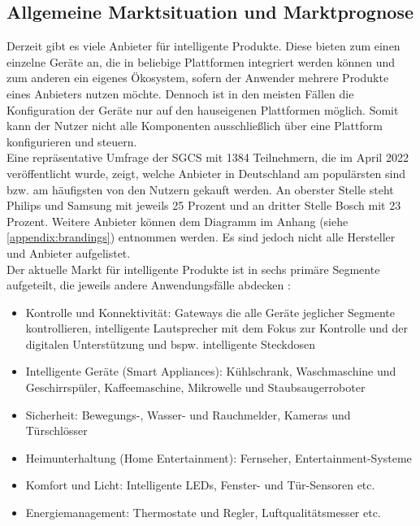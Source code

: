     \subsection{Allgemeine Marktsituation und Marktprognose}
        Derzeit gibt es viele Anbieter für intelligente Produkte. Diese bieten zum einen einzelne Geräte an, die in 
        beliebige Plattformen integriert werden können und zum anderen ein eigenes Ökosystem, sofern der Anwender 
        mehrere Produkte eines Anbieters nutzen möchte. Dennoch ist in den meisten Fällen die Konfiguration der Geräte nur auf 
        den hauseigenen Plattformen möglich. Somit kann der Nutzer nicht alle Komponenten ausschließlich über eine Plattform 
        konfigurieren und steuern. 
        \\
        \linebreak
        Eine repräsentative Umfrage der \ac{SGCS} mit 1384 Teilnehmern, die im April 2022 veröffentlicht wurde, zeigt, welche 
        Anbieter in Deutschland am populärsten sind bzw. am häufigsten von den Nutzern gekauft werden. An oberster Stelle 
        steht Philips und Samsung mit jeweils 25 Prozent und an dritter Stelle Bosch mit 23 Prozent. Weitere Anbieter können dem 
        Diagramm im Anhang (siehe \ref{appendix:brandings}) entnommen werden. Es sind jedoch nicht alle Hersteller und 
        Anbieter aufgelistet. 
        \\
        \linebreak
        Der aktuelle Markt für intelligente Produkte ist in sechs primäre Segmente aufgeteilt, die jeweils andere Anwendungsfälle 
        abdecken \cite{statista2021}:
        \begin{itemize}
            \item Kontrolle und Konnektivität: Gateways die alle Geräte jeglicher Segmente kontrollieren, intelligente Lautsprecher 
            mit dem Fokus zur Kontrolle und der digitalen Unterstützung und bspw. intelligente Steckdosen
            \item Intelligente Geräte (Smart Appliances): Kühlschrank, Waschmaschine und Geschirrspüler, Kaffeemaschine, Mikrowelle 
            und Staubsaugerroboter
            \item Sicherheit: Bewegungs-, Wasser- und Rauchmelder, Kameras und Türschlösser
            \item Heimunterhaltung (Home Entertainment): Fernseher, Entertainment-Systeme 
            \item Komfort und Licht: Intelligente LEDs, Fenster- und Tür-Sensoren etc.
            \item Energiemanagement: Thermostate und Regler, Luftqualitätsmesser etc. 
        \end{itemize}

